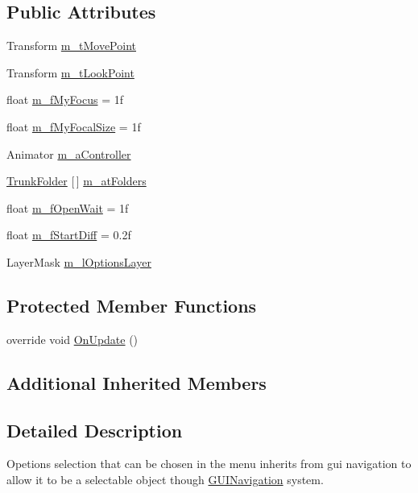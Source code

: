 \subsection*{Public Attributes}
\begin{DoxyCompactItemize}
\item 
Transform \mbox{\hyperlink{class_options_area_a1de4aba313b17d844664ea81e7fec4bb}{m\+\_\+t\+Move\+Point}}
\item 
Transform \mbox{\hyperlink{class_options_area_a7aa5c91471e3a5bcdbf0e38e3be8cacc}{m\+\_\+t\+Look\+Point}}
\item 
float \mbox{\hyperlink{class_options_area_a8e365fbd3aa90685b71aaff67b14797f}{m\+\_\+f\+My\+Focus}} = 1f
\item 
float \mbox{\hyperlink{class_options_area_a2c57b5d9bc4ef6dae87e98a5c5c31de6}{m\+\_\+f\+My\+Focal\+Size}} = 1f
\item 
Animator \mbox{\hyperlink{class_options_area_a7598d72d506cdca00f7d5882a315464c}{m\+\_\+a\+Controller}}
\item 
\mbox{\hyperlink{class_trunk_folder}{Trunk\+Folder}} \mbox{[}$\,$\mbox{]} \mbox{\hyperlink{class_options_area_aef24a9270c1caae2bbced4f6987dda0a}{m\+\_\+at\+Folders}}
\item 
float \mbox{\hyperlink{class_options_area_a4cb4df1c8c9977349692d75b6f16a018}{m\+\_\+f\+Open\+Wait}} = 1f
\item 
float \mbox{\hyperlink{class_options_area_a8c0394c87bffd811c9abc33c532878c2}{m\+\_\+f\+Start\+Diff}} = 0.\+2f
\item 
Layer\+Mask \mbox{\hyperlink{class_options_area_a8c9824e0ef97f503a011f8a00811f7c0}{m\+\_\+l\+Options\+Layer}}
\end{DoxyCompactItemize}
\subsection*{Protected Member Functions}
\begin{DoxyCompactItemize}
\item 
override void \mbox{\hyperlink{class_options_area_af06ad11cd346ebbc8c4f3314471710b3}{On\+Update}} ()
\end{DoxyCompactItemize}
\subsection*{Additional Inherited Members}


\subsection{Detailed Description}
Opetions selection that can be chosen in the menu inherits from gui navigation to allow it to be a selectable object though \mbox{\hyperlink{class_g_u_i_navigation}{G\+U\+I\+Navigation}} system. 



